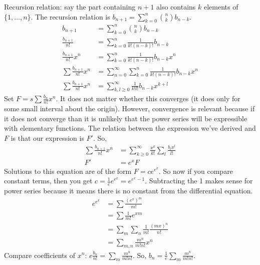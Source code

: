 \documentclass[12pt]{article}
\theoremstyle{definition}
\begin{document}
Recursion relation: say the part containing $n + 1 $ also contains $k$ elements
of $\{1, \ldots , n\}$. The recursion relation is $b_{n+1} = \sum_{k=0}^n {n
\choose k} b_{n-k}$.
\begin{align*}
b_{n+1} &= \sum_{k=0}^n {n \choose k} b_{n-k} \\
\frac{b_{n+1}}{n!} &= \sum_{k=0}^n \frac{1}{k!(n-k)!} b_{n-k} \\
\frac{b_{n+1}}{n!} x^n &= \sum_{k=0}^n \frac{1}{k!(n-k)!} b_{n-k} x^n \\
\sum \frac{b_{n+1}}{n!} x^n &= \sum_{n=0}^\infty \sum_{k=0}^n \frac{1}{k!(n-k)!} b_{n-k} x^n \\
\sum \frac{b_{n+1}}{n!} x^n &= \sum_{k, l \ge 0}^\infty \frac{1}{k!l!} b_{n-k} x^{k+l}
\end{align*}
Set $F = s\sum \frac{b_n}{n!} x^n$. It does not matter whether this converges
(it does only for some small interval about the origin). However, convergence
is relevant because if it does not converge than it is unlikely that the power
series will be expressible with elementary functions. The relation between the
expression we've derived and $F$ is that our expression is $F'$. So,
\begin{align*}
    \sum \frac{b_{n+1}}{n!} x^n &= \sum_{k \ge 0}^\infty \frac{x^k}{k!} \sum_l
    \frac{b_l x^l}{l!} \\
    F' &= e^xF
\end{align*}
Solutions to this equation are of the form $F = ce^{e^x}$. So now if you
compare constant terms, then you get $c = \frac{1}{e} e^{e^x} = e^{e^x - 1}$.
Subtracting the 1 makes sense for power series because it means there is no
constant from the differential equation.
\begin{align*}
    e^{e^x} &= \sum \frac{(e^x)^m}{m!} \\
    &= \sum \frac{1}{m!} e^{xm} \\
    &= \sum_m \sum_n \frac{1}{m!} \frac{(mx)^n}{n!} \\
    &= \sum_{m,n} \frac{m^n}{m!n!} x^n
\end{align*}
Compare coefficients of $x^n$: $e\frac{b_n}{n!} = \sum_m \frac{m^n}{m!n!}$. So,
$b_n = \frac{1}{e}\sum_m \frac{m^n}{m!n!}$.
\end{document}
